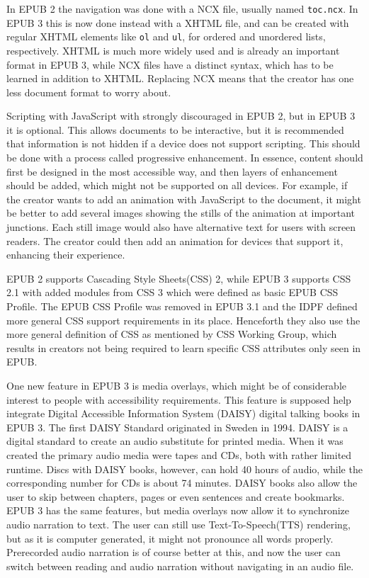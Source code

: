 In EPUB 2 the navigation was done with a NCX file, usually named \lstinline|toc.ncx|.\cite{EPUB3bp} In EPUB 3 this is now done instead with a XHTML file, and can be created with regular XHTML elements like \lstinline|ol| and \lstinline|ul|, for ordered and unordered lists, respectively. XHTML is much more widely used and is already an important format in EPUB 3, while NCX files have a distinct syntax, which has to be learned in addition to XHTML. Replacing NCX means that the creator has one less document format to worry about.

Scripting with JavaScript with strongly discouraged in EPUB 2, but in EPUB 3 it is optional.\cite{EPUB3bp} This allows documents to be interactive, but it is recommended that information is not hidden if a device does not support scripting. This should be done with a process called progressive enhancement. In essence, content should first be designed in the most accessible way, and then layers of enhancement should be added, which might not be supported on all devices. For example, if the creator wants to add an animation with JavaScript to the document, it might be better to add several images showing the stills of the animation at important junctions. Each still image would also have alternative text for users with screen readers. The creator could then add an animation for devices that support it, enhancing their experience.

EPUB 2 supports Cascading Style Sheets(CSS) 2, while EPUB 3 supports CSS 2.1 with added modules from CSS 3 which were defined as basic EPUB CSS Profile. The EPUB CSS Profile was removed in EPUB 3.1 and the IDPF defined more general CSS support requirements in its place.\cite{EPUB31changes} Henceforth they also use the more general definition of CSS as mentioned by CSS Working Group, which results in creators not being required to learn specific CSS attributes only seen in EPUB.

One new feature in EPUB 3 is media overlays, which might be of considerable interest to people with accessibility requirements.\cite{EPUB3bp} This feature is supposed help integrate Digital Accessible Information System (DAISY) digital talking books in EPUB 3. The first DAISY Standard originated in Sweden in 1994. DAISY is a digital standard to create an audio substitute for printed media.\cite{daisyAccessibility} When it was created the primary audio media were tapes and CDs, both with rather limited runtime. Discs with DAISY books, however, can hold 40 hours of audio, while the corresponding number for CDs is about 74 minutes.\cite{wasIstDaisy} DAISY books also allow the user to skip between chapters, pages or even sentences and create bookmarks. EPUB 3 has the same features, but media overlays now allow it to synchronize audio narration to text. The user can still use Text-To-Speech(TTS) rendering, but as it is computer generated, it might not pronounce all words properly. Prerecorded audio narration is of course better at this, and now the user can switch between reading and audio narration without navigating in an audio file.

